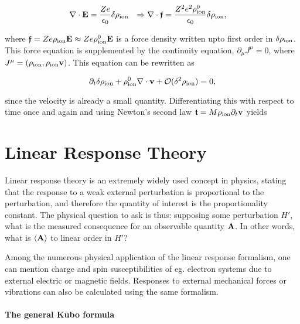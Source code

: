 \documentclass{homework}
\begin{document}
\begin{align}
    \nabla \cdot {\bf E} &= \frac{Ze}{\epsilon_0} \delta \rho_{\textnormal{ion}} & \Rightarrow  \nabla \cdot \bm{\mathfrak{f}} &= \frac{Z^2 e^2 \rho^0_{\textnormal{ion}} }{\epsilon_0} \delta \rho_{\textnormal{ion}},
\end{align}

where $\bm{\mathfrak{f}} = Z e \rho_{\textnormal{ion}} {\bf E} \approx Z e \rho^0_{\textnormal{ion}} {\bf E}$ is a force density written upto first order in $\delta \rho_{\textnormal{ion}}$. This force equation is supplemented by the continuity equation, $\partial_{\mu} J^\mu = 0$, where $J^\mu = (\rho_{\textnormal{ion}}, \rho_{\textnormal{ion}} {\bf v})$. This equation can be rewritten as 

$$
\partial_t \delta \rho_{\textnormal{ion}} +  \rho^0_{\textnormal{ion}} \nabla \cdot {\bf v} + \mathcal{O}(\delta^2 \rho_{\textnormal{ion}}) = 0,
$$

since the velocity is already a small quantity. Differentiating this with respect to time once and again and using Newton's second law $\bm{\mathfrak{t}} = M \rho_{\textnormal{ion}} \partial_t {\bf v}$ yields 


\clearpage

\section{Linear Response Theory}

Linear response theory is an extremely widely used concept in physics, stating that the response to a weak external perturbation is proportional to the perturbation, and therefore the quantity of interest is the proportionality constant. The physical question to ask is thus: supposing some perturbation $H'$, what is the measured consequence for an observable quantity ${\bf A}$. In other words, what is $\langle {\bf A} \rangle$ to linear order in $H'$? 

Among the numerous physical application of the linear response formalism, one can mention charge and spin susceptibilities of eg. electron systems due to external electric or magnetic fields. Responses to external mechanical forces or vibrations can also be calculated using the same formalism. \\

\paragraph{\textbf{The general Kubo formula}}
\end{document}
